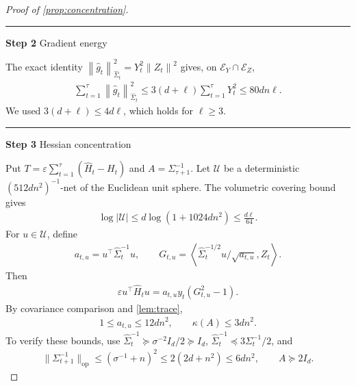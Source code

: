 \documentclass[11pt]{article}
\newcommand{\proofstep}[2]{%
    \par\medskip
    \noindent
    \textcolor{blue!55!black}{\rule{2pt}{1.2em}}%
    \hspace{0.6em}%
    {\sffamily\bfseries\color{blue!55!black}Step #1}%
    \quad
    {\sffamily #2}%
    \par\smallskip
}
\newcommand{\op}{\mathrm{op}}
\newcommand{\1}{\mathbf 1}
\newcommand{\eps}{\varepsilon}
\newcommand{\ip}[2]{\left\langle #1,#2\right\rangle}
\newcommand{\norm}[1]{\left\lVert #1\right\rVert}
\newcommand{\normm}[2]{\left\lVert #1\right\rVert_{#2}}
\begin{document}
\begin{proof}[Proof of \cref{prop:concentration}]
    \proofstep{2}{Gradient energy}
    The exact identity
    $\normm{\widehat g_t}{\widehat\Sigma_t}^2=Y_t^2\norm{Z_t}^2$
    gives, on $\mathcal E_Y\cap\mathcal E_Z$,
    \begin{align}
        \sum_{t=1}^\tau\normm{\widehat g_t}{\widehat\Sigma_t}^2
        \leq3(d+\ell)\sum_{t=1}^\tau Y_t^2
        \leq80dn\ell.
    \end{align}
    We used $3(d+\ell)\leq4d\ell$, which holds for $\ell\geq3$.

    \proofstep{3}{Hessian concentration}
    Put $T=\eps\sum_{t=1}^\tau(\widehat H_t-H_t)$ and
    $A=\Sigma_{\tau+1}^{-1}$. Let $\mathcal U$ be a deterministic
    $(512dn^2)^{-1}$-net of the Euclidean unit sphere. The volumetric
    covering bound gives
    \begin{align}
        \log|\mathcal U|
        \leq d\log(1+1024dn^2)\leq\frac{d\ell}{64}.
        \label{eq:H-net-size}
    \end{align}
    For $u\in\mathcal U$, define
    \begin{align}
        a_{t,u}=u^\top\widehat\Sigma_t^{-1}u,
        \qquad
        G_{t,u}=
        \ip{\widehat\Sigma_t^{-1/2}u/\sqrt{a_{t,u}}}{Z_t}.
        \label{eq:H-standardisation}
    \end{align}
    Then
    \begin{align}
        \eps u^\top\widehat H_tu
        =a_{t,u}y_t(G_{t,u}^2-1).
        \label{eq:H-direction}
    \end{align}
    By covariance comparison and \cref{lem:trace},
    \begin{align}
        1\leq a_{t,u}\leq12dn^2,
        \qquad
        \kappa(A)\leq3dn^2.
        \label{eq:concentration-spectrum}
    \end{align}
    To verify these bounds, use
    $\widehat\Sigma_t^{-1}\succeq\sigma^{-2}I_d/2\succeq I_d$,
    $\widehat\Sigma_t^{-1}\preceq3\Sigma_t^{-1}/2$, and
    \begin{align}
        \|\Sigma_{t+1}^{-1}\|_{\op}
        \leq(\sigma^{-1}+n)^2
        \leq2(2d+n^2)\leq6dn^2,
        \qquad A\succeq2I_d.
    \end{align}


\end{proof}
\end{document}

